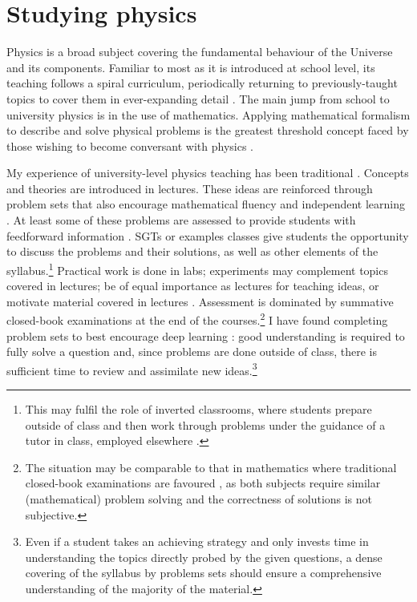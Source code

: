 \section{Studying physics}\label{sec:physics}

Physics is a broad subject covering the fundamental behaviour of the Universe and its components. Familiar to most as it is introduced at school level, its teaching follows a spiral curriculum, periodically returning to previously-taught topics to cover them in ever-expanding detail \citep{Bruner1960}. The main jump from school to university physics is in the use of mathematics. Applying mathematical formalism to describe and solve physical problems is the greatest threshold concept \citep{Meyer2003} faced by those wishing to become conversant with physics \citep{Wigner1960,Roth1994}.

My experience of university-level physics teaching has been traditional \citep[cf.][]{Iannone2015}. Concepts and theories are introduced in lectures. These ideas are reinforced through problem sets that also encourage mathematical fluency and independent learning \citep{Pike2015}. At least some of these problems are assessed to provide students with feedforward information \citep{Bloxham2015}. SGTs or examples classes give students the opportunity to discuss the problems and their solutions, as well as other elements of the syllabus.\footnote{This may fulfil the role of inverted classrooms, where students prepare outside of class and then work through problems under the guidance of a tutor in class, employed elsewhere \citep{Lage2000}.} Practical work is done in labs; experiments may complement topics covered in lectures;%
be of equal importance as lectures for teaching ideas, %
or motivate material covered in lectures %
\citep{Hanif2009}. Assessment is dominated by summative closed-book examinations at the end of the courses.\footnote{The situation may be comparable to that in mathematics where traditional closed-book examinations are favoured \citep{Iannone2014}, as both subjects require similar (mathematical) problem solving and the correctness of solutions is not subjective.} I have found completing problem sets to best encourage deep learning \citep{Marton1976,Marton1976a}: good understanding is required to fully solve a question and, since problems are done outside of class, there is sufficient time to review and assimilate new ideas.\footnote{Even if a student takes an achieving strategy \citep[chapter 2]{Biggs1987} and only invests time in understanding the topics directly probed by the given questions, a dense covering of the syllabus by problems sets should ensure a comprehensive understanding of the majority of the material.}

